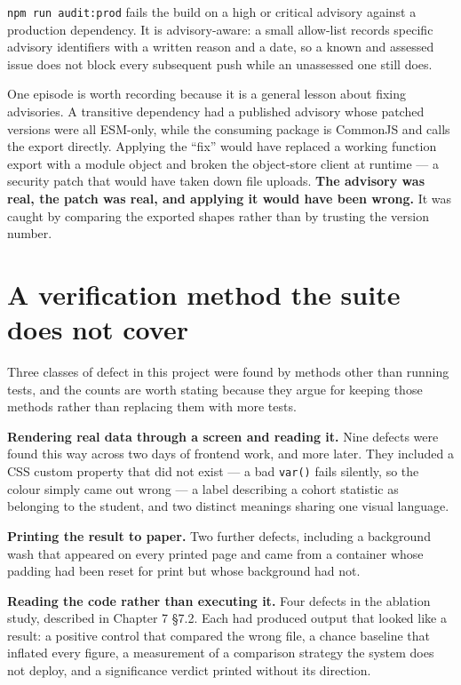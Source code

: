 \texttt{npm\ run\ audit:prod} fails the build on a high or critical
advisory against a production dependency. It is advisory-aware: a small
allow-list records specific advisory identifiers with a written reason
and a date, so a known and assessed issue does not block every
subsequent push while an unassessed one still does.

One episode is worth recording because it is a general lesson about
fixing advisories. A transitive dependency had a published advisory
whose patched versions were all ESM-only, while the consuming package is
CommonJS and calls the export directly. Applying the ``fix'' would have
replaced a working function export with a module object and broken the
object-store client at runtime --- a security patch that would have
taken down file uploads. \textbf{The advisory was real, the patch was
real, and applying it would have been wrong.} It was caught by comparing
the exported shapes rather than by trusting the version number.

\hypertarget{a-verification-method-the-suite-does-not-cover}{%
\section{A verification method the suite does not
cover}\label{a-verification-method-the-suite-does-not-cover}}

Three classes of defect in this project were found by methods other than
running tests, and the counts are worth stating because they argue for
keeping those methods rather than replacing them with more tests.

\textbf{Rendering real data through a screen and reading it.} Nine
defects were found this way across two days of frontend work, and more
later. They included a CSS custom property that did not exist --- a bad
\texttt{var()} fails silently, so the colour simply came out wrong --- a
label describing a cohort statistic as belonging to the student, and two
distinct meanings sharing one visual language.

\textbf{Printing the result to paper.} Two further defects, including a
background wash that appeared on every printed page and came from a
container whose padding had been reset for print but whose background
had not.

\textbf{Reading the code rather than executing it.} Four defects in the
ablation study, described in Chapter 7 \S{}7.2. Each had produced output
that looked like a result: a positive control that compared the wrong
file, a chance baseline that inflated every figure, a measurement of a
comparison strategy the system does not deploy, and a significance
verdict printed without its direction.


